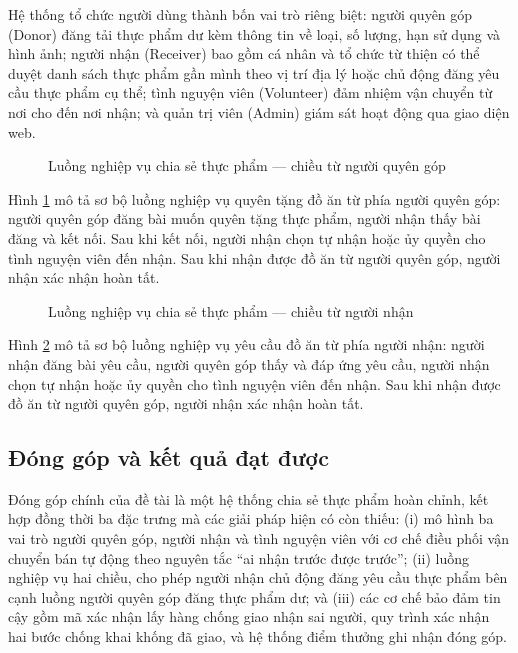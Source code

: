 \documentclass[../main.tex]{subfiles}%
\begin{document}
Hệ thống tổ chức người dùng thành bốn vai trò riêng biệt: người quyên góp (Donor) đăng tải thực phẩm dư kèm thông tin về loại, số lượng, hạn sử dụng và hình ảnh; người nhận (Receiver) bao gồm cá nhân và tổ chức từ thiện có thể duyệt danh sách thực phẩm gần mình theo vị trí địa lý hoặc chủ động đăng yêu cầu thực phẩm cụ thể; tình nguyện viên (Volunteer) đảm nhiệm vận chuyển từ nơi cho đến nơi nhận; và quản trị viên (Admin) giám sát hoạt động qua giao diện web.

\begin{figure}[H]
    \centering
    \caption{Luồng nghiệp vụ chia sẻ thực phẩm --- chiều từ người quyên góp}
    \label{fig:luong_tu_nguoi_cho}
\end{figure}

Hình \ref{fig:luong_tu_nguoi_cho} mô tả sơ bộ luồng nghiệp vụ quyên tặng đồ ăn từ phía người quyên góp: người quyên góp đăng bài muốn quyên tặng thực phẩm, người nhận thấy bài đăng và kết nối. Sau khi kết nối, người nhận chọn tự nhận hoặc ủy quyền cho tình nguyện viên đến nhận. Sau khi nhận được đồ ăn từ người quyên góp, người nhận xác nhận hoàn tất.

\begin{figure}[H]
    \centering
    \caption{Luồng nghiệp vụ chia sẻ thực phẩm --- chiều từ người nhận}
    \label{fig:luong_tu_nguoi_nhan}
\end{figure}

Hình \ref{fig:luong_tu_nguoi_nhan} mô tả sơ bộ luồng nghiệp vụ yêu cầu đồ ăn từ phía người nhận: người nhận đăng bài yêu cầu, người quyên góp thấy và đáp ứng yêu cầu, người nhận chọn tự nhận hoặc ủy quyền cho tình nguyện viên đến nhận. Sau khi nhận được đồ ăn từ người quyên góp, người nhận xác nhận hoàn tất.

\subsection{Đóng góp và kết quả đạt được}
\label{subsection:1.3.3}

Đóng góp chính của đề tài là một hệ thống chia sẻ thực phẩm hoàn chỉnh, kết hợp đồng thời ba đặc trưng mà các giải pháp hiện có còn thiếu: (i) mô hình ba vai trò người quyên góp, người nhận và tình nguyện viên với cơ chế điều phối vận chuyển bán tự động theo nguyên tắc ``ai nhận trước được trước''; (ii) luồng nghiệp vụ hai chiều, cho phép người nhận chủ động đăng yêu cầu thực phẩm bên cạnh luồng người quyên góp đăng thực phẩm dư; và (iii) các cơ chế bảo đảm tin cậy gồm mã xác nhận lấy hàng chống giao nhận sai người, quy trình xác nhận hai bước chống khai khống đã giao, và hệ thống điểm thưởng ghi nhận đóng góp.
\end{document}
